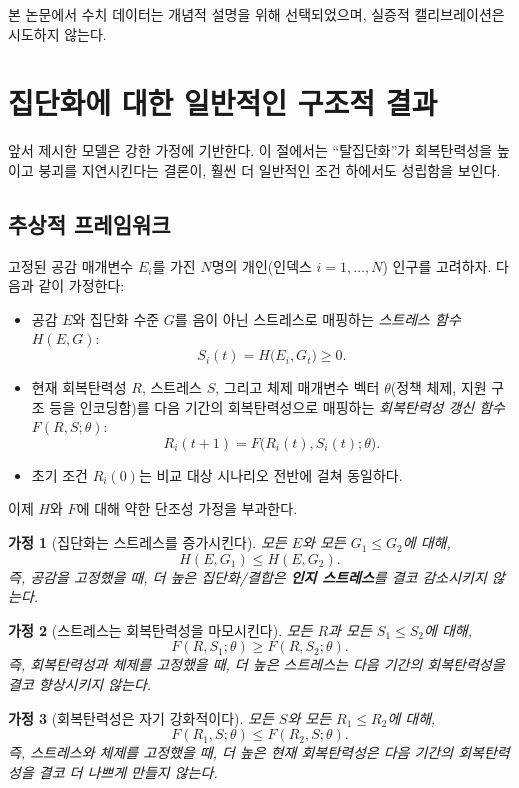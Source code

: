 \documentclass[11pt]{article}
\theoremstyle{plain}
\newtheorem{assumption}{가정}
\begin{document}
본 논문에서 수치 데이터는 개념적 설명을 위해 선택되었으며, 실증적 캘리브레이션은 시도하지 않는다.

\section{집단화에 대한 일반적인 구조적 결과}
\label{sec:general}

앞서 제시한 모델은 강한 가정에 기반한다.
이 절에서는 ``탈집단화''가 회복탄력성을 높이고 붕괴를 지연시킨다는 결론이, 훨씬 더 일반적인 조건 하에서도 성립함을 보인다.

\subsection{추상적 프레임워크}

고정된 공감 매개변수 $E_i$를 가진 $N$명의 개인(인덱스 $i=1,\dots,N$) 인구를 고려하자.
다음과 같이 가정한다:
\begin{itemize}
  \item 공감 $E$와 집단화 수준 $G$를 음이 아닌 스트레스로 매핑하는 \emph{스트레스 함수} $H(E,G)$:
  \[
  S_i(t) = H\bigl(E_i, G_t\bigr) \ge 0.
  \]
  \item 현재 회복탄력성 $R$, 스트레스 $S$, 그리고 체제 매개변수 벡터 $\theta$(정책 체제, 지원 구조 등을 인코딩함)를 다음 기간의 회복탄력성으로 매핑하는 \emph{회복탄력성 갱신 함수} $F(R,S;\theta)$:
  \[
  R_i(t+1) = F\bigl(R_i(t), S_i(t); \theta\bigr).
  \]
  \item 초기 조건 $R_i(0)$는 비교 대상 시나리오 전반에 걸쳐 동일하다.
\end{itemize}

이제 $H$와 $F$에 대해 약한 단조성 가정을 부과한다.

\begin{assumption}[집단화는 스트레스를 증가시킨다]
\label{ass:group-stress}
모든 $E$와 모든 $G_1 \le G_2$에 대해,
\[
H(E,G_1) \le H(E,G_2).
\]
즉, 공감을 고정했을 때, 더 높은 집단화/결합은 \textbf{인지 스트레스}를 결코 감소시키지 않는다.
\end{assumption}

\begin{assumption}[스트레스는 회복탄력성을 마모시킨다]
\label{ass:stress-resilience}
모든 $R$과 모든 $S_1 \le S_2$에 대해,
\[
F(R,S_1;\theta) \ge F(R,S_2;\theta).
\]
즉, 회복탄력성과 체제를 고정했을 때, 더 높은 스트레스는 다음 기간의 회복탄력성을 결코 향상시키지 않는다.
\end{assumption}

\begin{assumption}[회복탄력성은 자기 강화적이다]
\label{ass:res-monotone}
모든 $S$와 모든 $R_1 \le R_2$에 대해,
\[
F(R_1,S;\theta) \le F(R_2,S;\theta).
\]
즉, 스트레스와 체제를 고정했을 때, 더 높은 현재 회복탄력성은 다음 기간의 회복탄력성을 결코 더 나쁘게 만들지 않는다.
\end{assumption}
\end{document}

